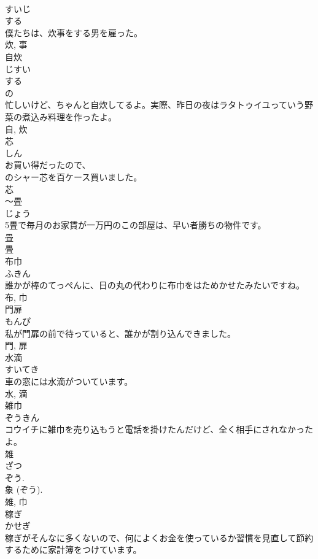 \documentclass[8pt]{extreport}
\begin{document}
\begin{CJK}{UTF8}{min}
\\	すいじ	
\\	する 
\\	僕たちは、炊事をする男を雇った。	
\\	炊, 事	
\\	自炊	
\\	じすい	
\\	する 
\\	の 
\\	忙しいけど、ちゃんと自炊してるよ。実際、昨日の夜はラタトゥイユっていう野菜の煮込み料理を作ったよ。	
\\	自, 炊	
\\	芯	
\\	しん	
\\	お買い得だったので、
\\	のシャー芯を百ケース買いました。	
\\	芯	
\\	〜畳	
\\	じょう	
\\	5畳で毎月のお家賃が一万円のこの部屋は、早い者勝ちの物件です。	
\\	畳 
\\	畳	
\\	布巾	
\\	ふきん	
\\	誰かが棒のてっぺんに、日の丸の代わりに布巾をはためかせたみたいですね。	
\\	布, 巾	
\\	門扉	
\\	もんぴ	
\\	私が門扉の前で待っていると、誰かが割り込んできました。	
\\	門, 扉	
\\	水滴	
\\	すいてき	
\\	車の窓には水滴がついています。	
\\	水, 滴	
\\	雑巾	
\\	ぞうきん	
\\	コウイチに雑巾を売り込もうと電話を掛けたんだけど、全く相手にされなかったよ。	
\\	雑 
\\	ざつ 
\\	ぞう. 
\\	象 (ぞう). 
\\	雑, 巾	
\\	稼ぎ	
\\	かせぎ	
\\	稼ぎがそんなに多くないので、何によくお金を使っているか習慣を見直して節約するために家計簿をつけています。	

\end{CJK}
\end{document}
